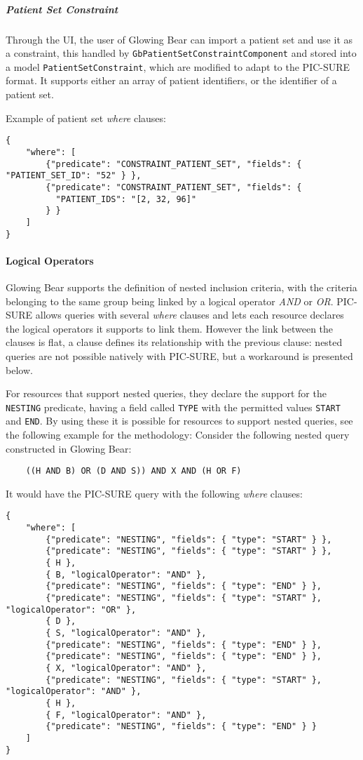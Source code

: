 \subparagraph{Patient Set Constraint}
Through the UI, the user of Glowing Bear can import a patient set and use it as a constraint, this handled by \verb|GbPatientSetConstraintComponent| and stored into a model \verb|PatientSetConstraint|, which are modified to adapt to the PIC-SURE format.
It supports either an array of patient identifiers, or the identifier of a patient set.

Example of patient set \emph{where} clauses:
\begin{verbatim}
{
    "where": [
        {"predicate": "CONSTRAINT_PATIENT_SET", "fields": { "PATIENT_SET_ID": "52" } },
        {"predicate": "CONSTRAINT_PATIENT_SET", "fields": { 
          "PATIENT_IDS": "[2, 32, 96]" 
        } }
    ]
}
\end{verbatim}


\paragraph{Logical Operators}
\label{sec:gb-logical-operators}

Glowing Bear supports the definition of nested inclusion criteria, with the criteria belonging to the same group being linked by a logical operator \emph{AND} or \emph{OR}.
PIC-SURE allows queries with several \emph{where} clauses and lets each resource declares the logical operators it supports to link them. 
However the link between the clauses is flat, a clause defines its relationship with the previous clause: nested queries are not possible natively with PIC-SURE, but a workaround is presented below.

For resources that support nested queries, they declare the support for the \verb|NESTING| predicate, having a field called \verb|TYPE| with the permitted values \verb|START| and \verb|END|.
By using these it is possible for resources to support nested queries, see the following example for the methodology:
Consider the following nested query constructed in Glowing Bear:
\begin{verbatim}
    ((H AND B) OR (D AND S)) AND X AND (H OR F)
\end{verbatim}
It would have the PIC-SURE query with the following \emph{where} clauses:
\begin{verbatim}
{
    "where": [
        {"predicate": "NESTING", "fields": { "type": "START" } },
        {"predicate": "NESTING", "fields": { "type": "START" } },
        { H },
        { B, "logicalOperator": "AND" },
        {"predicate": "NESTING", "fields": { "type": "END" } },
        {"predicate": "NESTING", "fields": { "type": "START" }, "logicalOperator": "OR" },
        { D },
        { S, "logicalOperator": "AND" },
        {"predicate": "NESTING", "fields": { "type": "END" } },
        {"predicate": "NESTING", "fields": { "type": "END" } },
        { X, "logicalOperator": "AND" },
        {"predicate": "NESTING", "fields": { "type": "START" }, "logicalOperator": "AND" },
        { H },
        { F, "logicalOperator": "AND" },
        {"predicate": "NESTING", "fields": { "type": "END" } }
    ]
}
\end{verbatim}

